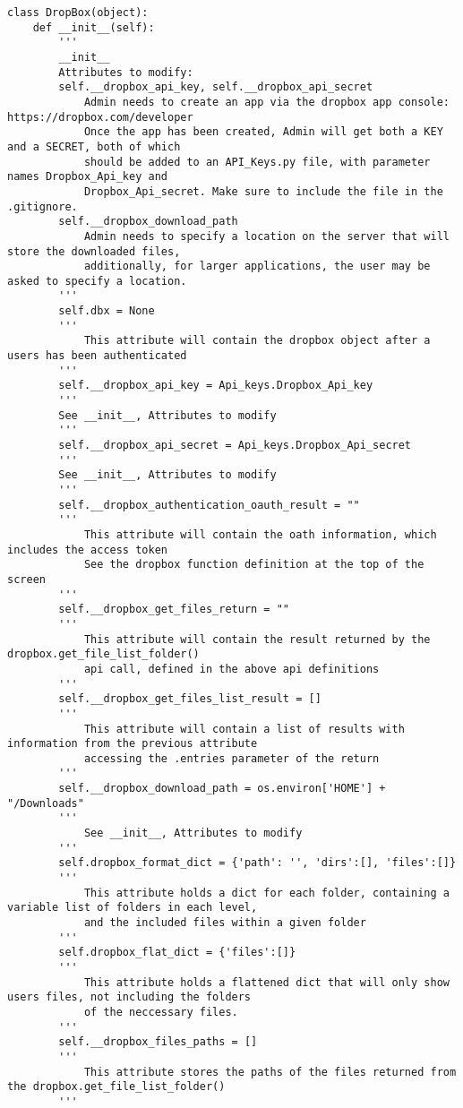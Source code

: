 \documentclass{article}
\begin{document}
\begin{verbatim}
class DropBox(object):
    def __init__(self):
        '''
        __init__
        Attributes to modify:
        self.__dropbox_api_key, self.__dropbox_api_secret
            Admin needs to create an app via the dropbox app console: https://dropbox.com/developer
            Once the app has been created, Admin will get both a KEY and a SECRET, both of which 
            should be added to an API_Keys.py file, with parameter names Dropbox_Api_key and 
            Dropbox_Api_secret. Make sure to include the file in the .gitignore.
        self.__dropbox_download_path
            Admin needs to specify a location on the server that will store the downloaded files,
            additionally, for larger applications, the user may be asked to specify a location.
        '''
        self.dbx = None
        '''
            This attribute will contain the dropbox object after a users has been authenticated
        '''
        self.__dropbox_api_key = Api_keys.Dropbox_Api_key
        '''
        See __init__, Attributes to modify
        '''
        self.__dropbox_api_secret = Api_keys.Dropbox_Api_secret
        '''
        See __init__, Attributes to modify
        '''
        self.__dropbox_authentication_oauth_result = ""
        '''
            This attribute will contain the oath information, which includes the access token
            See the dropbox function definition at the top of the screen
        '''
        self.__dropbox_get_files_return = ""
        '''
            This attribute will contain the result returned by the dropbox.get_file_list_folder()
            api call, defined in the above api definitions
        '''
        self.__dropbox_get_files_list_result = []
        '''
            This attribute will contain a list of results with information from the previous attribute
            accessing the .entries parameter of the return
        '''
        self.__dropbox_download_path = os.environ['HOME'] + "/Downloads"
        '''
            See __init__, Attributes to modify
        '''
        self.dropbox_format_dict = {'path': '', 'dirs':[], 'files':[]}
        '''
            This attribute holds a dict for each folder, containing a variable list of folders in each level,
            and the included files within a given folder
        '''
        self.dropbox_flat_dict = {'files':[]}
        '''
            This attribute holds a flattened dict that will only show users files, not including the folders
            of the neccessary files. 
        '''
        self.__dropbox_files_paths = []
        '''
            This attribute stores the paths of the files returned from the dropbox.get_file_list_folder() 
        '''


\end{verbatim}
\end{document}

